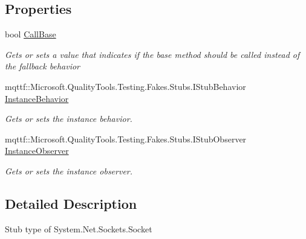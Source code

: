 \subsection*{Properties}
\begin{DoxyCompactItemize}
\item 
bool \hyperlink{class_system_1_1_net_1_1_sockets_1_1_fakes_1_1_stub_socket_a2c061a99bbf773d8556d6291180624c1}{Call\-Base}
\begin{DoxyCompactList}\small\item\em Gets or sets a value that indicates if the base method should be called instead of the fallback behavior\end{DoxyCompactList}\item 
mqttf\-::\-Microsoft.\-Quality\-Tools.\-Testing.\-Fakes.\-Stubs.\-I\-Stub\-Behavior \hyperlink{class_system_1_1_net_1_1_sockets_1_1_fakes_1_1_stub_socket_ac615acc09043dbd1229f4512cfff335b}{Instance\-Behavior}
\begin{DoxyCompactList}\small\item\em Gets or sets the instance behavior.\end{DoxyCompactList}\item 
mqttf\-::\-Microsoft.\-Quality\-Tools.\-Testing.\-Fakes.\-Stubs.\-I\-Stub\-Observer \hyperlink{class_system_1_1_net_1_1_sockets_1_1_fakes_1_1_stub_socket_a16598f57d3cbb330dbe70d7b11b9770c}{Instance\-Observer}
\begin{DoxyCompactList}\small\item\em Gets or sets the instance observer.\end{DoxyCompactList}\end{DoxyCompactItemize}


\subsection{Detailed Description}
Stub type of System.\-Net.\-Sockets.\-Socket



